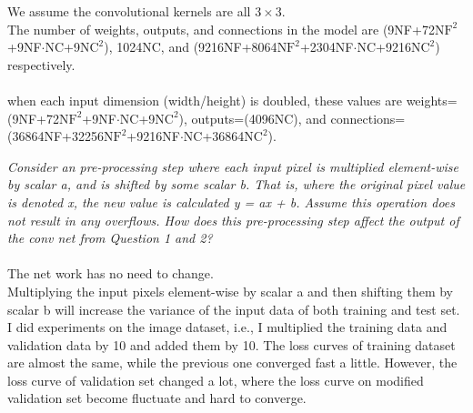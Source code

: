 \documentclass{myhw}
\begin{document}
\begin{homeworkProblem}
\begin{homeworkSection}
\begin{center}
\begin{tabular}[h]{ |c|c|c|c| }
\hline
\end{tabular}
\end{center}
We assume the convolutional kernels are all $3\times3$. \\
The number of weights, outputs, and connections in the model are (9NF+72$\text{NF}^2$+9NF$\cdot$NC+9$\text{NC}^2$), 1024NC, and (9216NF+8064$\text{NF}^2$+2304NF$\cdot$NC+9216$\text{NC}^2$) respectively. \\ \\
when each input dimension (width/height) is doubled, these values are weights=(9NF+72$\text{NF}^2$+9NF$\cdot$NC+9$\text{NC}^2$), outputs=(4096NC), and connections=(36864NF+32256$\text{NF}^2$+9216NF$\cdot$NC+36864$\text{NC}^2$).
\end{homeworkSection}
\begin{homeworkSection}
\emph{Consider an pre-processing step where each input pixel is multiplied element-wise by scalar a, and is shifted by some scalar b. That is, where the original pixel value is denoted x, the new value is calculated y = ax + b. Assume this operation does not result in any overflows. How does this pre-processing step affect the output of the conv net from Question 1 and 2?} \\ \\
The net work has no need to change. \\
Multiplying the input pixels element-wise by scalar a and then shifting them by scalar b will increase the variance of the input data of both training and test set. \\
I did experiments on the image dataset, i.e., I multiplied the training data and validation data by 10 and added them by 10. The loss curves of training dataset are almost the same, while the previous one converged fast a little. However, the loss curve of validation set changed a lot, where the loss curve on modified validation set become fluctuate and hard to converge.
\end{homeworkSection}
\end{homeworkProblem}
\end{document}
